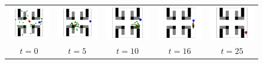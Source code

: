 \documentclass[letterpaper]{article} %
\begin{document}
\begin{figure}[!htb]
	\centering
	\begin{tabular}{ccccc}
		\includegraphics[width=0.18\linewidth]{figs/128/0.pdf} &
		\includegraphics[width=0.18\linewidth]{figs/128/5.pdf} &
		\includegraphics[width=0.18\linewidth]{figs/128/10.pdf} &
		\includegraphics[width=0.18\linewidth]{figs/128/16.pdf} &
		\includegraphics[width=0.18\linewidth]{figs/128/37.pdf} \\
		$t=0$ & $t=5$ & $t=10$ & $t=16$ & $t=25$
	\end{tabular}
\end{figure}
\end{document}
